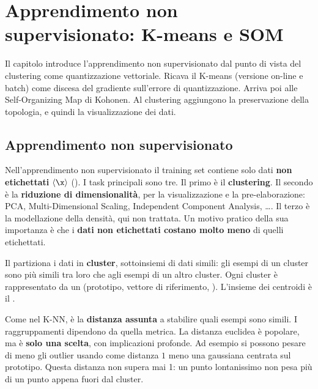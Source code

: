 \chapter{Apprendimento non supervisionato: K-means e SOM}
\label{cap:nonsup}

\begin{inbreve}
Il capitolo introduce l'apprendimento non supervisionato dal punto di vista del clustering come quantizzazione
vettoriale. Ricava il K-means (versione on-line e batch) come discesa del gradiente sull'errore di quantizzazione.
Arriva poi alle Self-Organizing Map di Kohonen. Al clustering aggiungono la preservazione della topologia, e quindi
la visualizzazione dei dati.
\end{inbreve}

\section{Apprendimento non supervisionato}

Nell'apprendimento non supervisionato il training set contiene solo dati \textbf{non etichettati} $\langle\x\rangle$
(). I task principali sono tre. Il primo è il \textbf{clustering}. Il secondo è la \textbf{riduzione di
dimensionalità}, per la visualizzazione e la pre-elaborazione: PCA, Multi-Dimensional Scaling, Independent
Component Analysis, \dots. Il terzo è la modellazione della densità, qui non trattata. Un motivo pratico della sua
importanza è che i \textbf{dati non etichettati costano molto meno} di quelli etichettati.

\begin{definizione}[Clustering]
Il  partiziona i dati in \textbf{cluster}, sottoinsiemi di dati simili: gli esempi di un cluster
sono più simili tra loro che agli esempi di un altro cluster. Ogni cluster è rappresentato da un 
(prototipo, vettore di riferimento, ). L'insieme dei centroidi è il .
\end{definizione}

\begin{attenzione}
Come nel K-NN, è la \textbf{distanza assunta} a stabilire quali esempi sono simili. I raggruppamenti dipendono da
quella metrica. La distanza euclidea è popolare, ma è \textbf{solo una scelta}, con implicazioni profonde. Ad
esempio si possono pesare di meno gli outlier usando come distanza $1$ meno una gaussiana centrata sul prototipo.
Questa distanza non supera mai 1: un punto lontanissimo non pesa più di un punto appena fuori dal cluster.
\end{attenzione}

